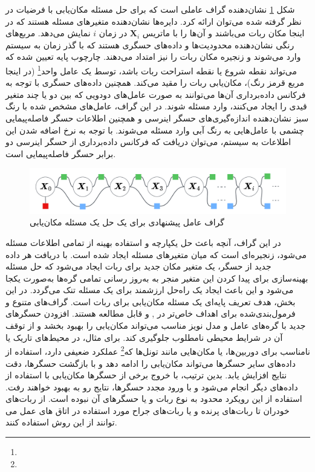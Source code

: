 شکل 
\ref{fig:localization}
نشان‌دهنده گراف عاملی است که برای حل مسئله مکان‌یابی با فرضیات در نظر گرفته شده می‌توان ارائه کرد. دایره‌ها نشان‌دهنده متغیرهای مسئله هستند که در اینجا مکان ربات می‌باشند و آن‌ها را با ماتریس
$\boldsymbol{X}_i$ 
در زمان $i$ نمایش می‌دهد. مربع‌های رنگی نشان‌دهنده محدودیت‌ها و داده‌های حسگری هستند که با گذر زمان به سیستم وارد می‌شوند و زنجیره مکان ربات را نیز امتداد می‌دهند. چارچوب پایه تعیین شده که می‌تواند نقطه شروع یا نقطه استراحت ربات باشد، توسط یک عامل واحد\footnote{}
(در اینجا مربع قرمز رنگ)، مکان‌یابی ربات را مقید می‌کند. همچنین داده‌های حسگری با توجه به فرکانس داده‌برداری آن‌ها می‌توانند به صورت عامل‌های دودویی که بین دو یا چند متغیر قیدی را ایجاد می‌کنند، وارد مسئله شوند. در این گراف، عامل‌های مشخص شده با رنگ سبز نشان‌دهنده اندازه‌گیری‌های حسگر اینرسی و همچنین اطلاعات حسگر فاصله‌پیمایی چشمی با عامل‌هایی به رنگ آبی وارد مسئله می‌شوند. با توجه به نرخ اضافه شدن این اطلاعات به سیستم، می‌توان دریافت که فرکانس داده‌برداری از حسگر اینرسی دو برابر حسگر فاصله‌پیمایی است. 
\begin{figure}
	\centering
	\includegraphics[width=0.7\linewidth]{img/Localization}
	\caption{گراف عامل پیشنهادی برای یک حل یک مسئله مکان‌یابی}
	\label{fig:localization}
\end{figure}

در این گراف، آنچه باعث حل یکپارچه و استفاده بهینه از تمامی اطلاعات مسئله می‌شود، زنجیره‌ای است که میان متغیرهای مسئله ایجاد شده است. با دریافت هر داده جدید از حسگر، یک متغیر مکان جدید برای ربات ایجاد می‌شود که حل مسئله بهینه‌سازی برای پیدا کردن این متغیر منجر به به‌روز رسانی تمامی گره‌ها به‌صورت یکجا می‌شود و این باعث ایجاد یک راه‌حل ارزشمند برای یک مسئله تنک می‌گردد. در این بخش، هدف تعریف پایه‌ای یک مسئله مکان‌یابی برای ربات است. گراف‌های متنوع و فرمول‌بندی‌شده برای اهداف خاص‌تر در
\cite{yang2022indoor}, 
\cite{song2021tightly}
و 
\cite{leitinger2017factor}
قابل مطالعه هستند. 
افزودن حسگرهای جدید با گره‌های عامل و مدل نویز مناسب می‌تواند مکان‌یابی را بهبود بخشد و از توقف آن در شرایط محیطی نامطلوب جلوگیری کند. برای مثال، در محیط‌های تاریک یا نامناسب برای دوربین‌ها، یا مکان‌هایی مانند تونل‌ها که\footnote{} عملکرد ضعیفی دارد، استفاده از داده‌های سایر حسگرها می‌تواند مکان‌یابی را ادامه دهد و با بازگشت حسگرها، دقت نتایج افزایش یابد. بدین ترتیب، با خروج برخی از حسگرها مکان‌یابی با استفاده از داده‌های دیگر انجام می‌شود و با ورود مجدد حسگرها، نتایج رو به بهبود خواهند رفت. استفاده از این رویکرد محدود به نوع ربات و یا حسگرهای آن نبوده است.  
از ربات‌های خودران
\cite{wilbers2019localization}
تا ربات‌های پرنده
\cite{dai2022uav}
و یا ربات‌های جراح مورد استفاده در اتاق های عمل می توانند از این روش استفاده کنند. 


